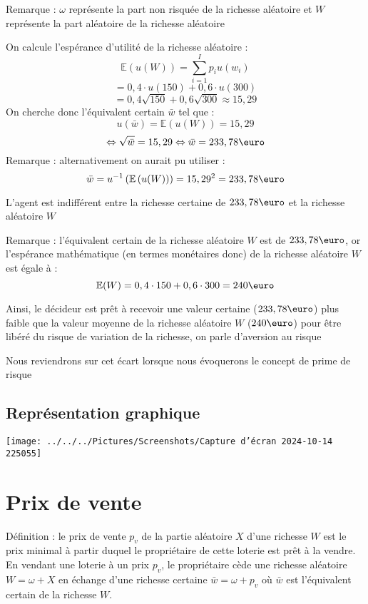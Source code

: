 \documentclass[a4paper, 12pt]{report}
\begin{document}
Remarque : $\omega$ représente la part non risquée de la richesse aléatoire et $W$ représente la part aléatoire de la richesse aléatoire

On calcule l'espérance d'utilité de la richesse aléatoire :
$$
\mathbb{E}\left( u(W) \right)=\sum_{i=1}^{I}p_iu(w_i)
$$
$$
=0,4 \cdot u(150) + 0,6 \cdot u(300)
$$
$$
=0,4 \sqrt{150}+ 0,6\sqrt{300} \approx 15,29
$$
On cherche donc l'équivalent certain $\bar{w}$ tel que :
$$
u(\bar{w})= \mathbb{E}\left( u(W) \right)=15,29
$$
$$
\Leftrightarrow \sqrt{\bar{w}}=15,29 \Leftrightarrow \bar{w} = 233,78 \text{\euro}
$$
Remarque : alternativement on aurait pu utiliser :
$$
\bar{w}=u^{-1}\left( \mathbb{E}\left( u(W) \right) \right)=15,29^2=233,78\text{\euro}
$$

L'agent est indifférent entre la richesse certaine de $233,78\text{\euro}$ et la richesse aléatoire $W$

Remarque : l'équivalent certain de la richesse aléatoire $W$ est de $233,78\text{\euro}$, or l'espérance mathématique (en termes monétaires donc) de la richesse aléatoire $W$ est égale à :
$$
\mathbb{E}(W)=0,4\cdot150+0,6\cdot300=240\text{\euro}
$$

Ainsi, le décideur est prêt à recevoir une valeur certaine ($233,78\text{\euro}$) plus faible que la valeur moyenne de la richesse aléatoire $W$ ($240\text{\euro}$) pour être libéré du risque de variation de la richesse, on parle d'aversion au risque

Nous reviendrons sur cet écart lorsque nous évoquerons le concept de prime de risque

\subsection{Représentation graphique}

\begin{center}
	\texttt{[image: ../../../Pictures/Screenshots/Capture d'écran 2024-10-14 225055]}
\end{center}

\section{Prix de vente}

Définition : le prix de vente \( p_v \) de la partie aléatoire \( X \) d'une richesse \( W \) est le prix minimal à partir duquel le propriétaire de cette loterie est prêt à la vendre. En vendant une loterie à un prix \( p_v \), le propriétaire cède une richesse aléatoire \( W = \omega + X \) en échange d'une richesse certaine \( \bar{w} = \omega + p_v \) où \( \bar{w} \) est l'équivalent certain de la richesse \( W \). 
\end{document}
